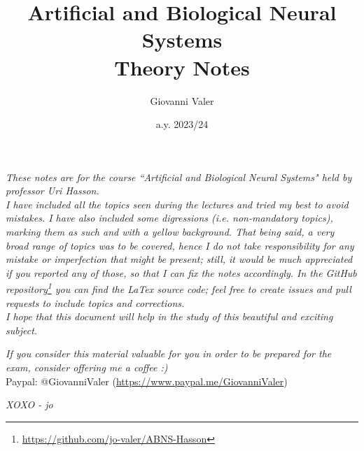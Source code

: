 \documentclass[]{report}
\title{\textbf{Artificial and Biological Neural Systems}\\\large \textbf{Theory Notes}}
\author{Giovanni Valer}
\date{a.y. 2023/24}
\begin{document}
\maketitle
{}

\newpage
{}
\textit{These notes are for the course ``Artificial and Biological Neural Systems" held by professor Uri Hasson.\\
I have included all the topics seen during the lectures and tried my best to avoid mistakes. I have also included some digressions (i.e. non-mandatory topics), marking them as such and with a yellow background. That being said, a very broad range of topics was to be covered, hence I do not take responsibility for any mistake or imperfection that might be present; still, it would be much appreciated if you reported any of those, so that I can fix the notes accordingly.
In the GitHub repository\footnote{\url{https://github.com/jo-valer/ABNS-Hasson}} you can find the LaTex source code; feel free to create issues and pull requests to include topics and corrections.\\
I hope that this document will help in the study of this beautiful and exciting subject.}
\newline

\textit{If you consider this material valuable for you in order to be prepared for the exam, consider offering me a coffee :)}\\
Paypal: @GiovanniValer (\url{https://www.paypal.me/GiovanniValer})
\newline

\textit{XOXO - jo}
\restoregeometry
\newpage

\tableofcontents
\clearpage







% 
% 
% 

% 


\end{document}
